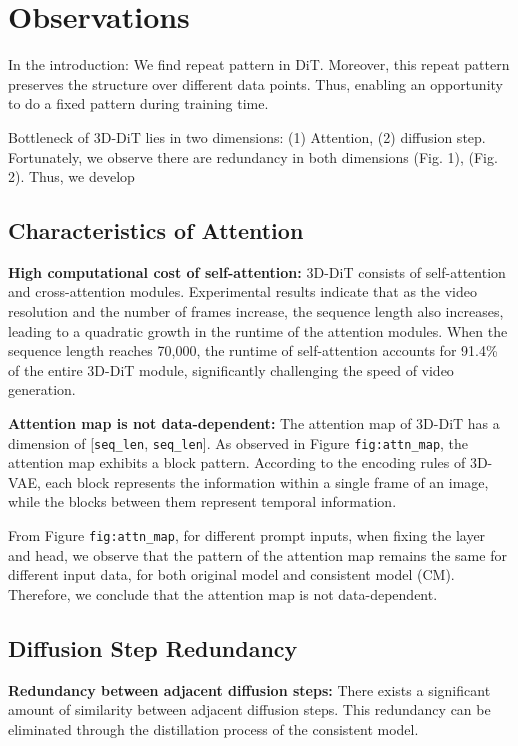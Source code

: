 
\section{Observations}

In the introduction:
We find repeat pattern in DiT. Moreover, this repeat pattern preserves the structure over different data points. Thus, enabling an opportunity to do a fixed pattern during training time.


Bottleneck of 3D-DiT lies in two dimensions: (1) Attention, (2) diffusion step. Fortunately, we observe there are redundancy in both dimensions (Fig. 1), (Fig. 2). Thus, we develop
\subsection{Characteristics of Attention}

\textbf{High computational cost of self-attention:} 3D-DiT consists of self-attention and cross-attention modules. Experimental results indicate that as the video resolution and the number of frames increase, the sequence length also increases, leading to a quadratic growth in the runtime of the attention modules. When the sequence length reaches 70,000, the runtime of self-attention accounts for 91.4\% of the entire 3D-DiT module, significantly challenging the speed of video generation.

\textbf{Attention map is not data-dependent:} The attention map of 3D-DiT has a dimension of [\texttt{seq\_len}, \texttt{seq\_len}]. As observed in Figure \texttt{fig:attn\_map}, the attention map exhibits a block pattern. According to the encoding rules of 3D-VAE, each block represents the information within a single frame of an image, while the blocks between them represent temporal information.

From Figure \texttt{fig:attn\_map}, for different prompt inputs, when fixing the layer and head, we observe that the pattern of the attention map remains the same for different input data, for both original model and consistent model (CM). Therefore, we conclude that the attention map is not data-dependent.

\subsection{Diffusion Step Redundancy}

\textbf{Redundancy between adjacent diffusion steps:} There exists a significant amount of similarity between adjacent diffusion steps. This redundancy can be eliminated through the distillation process of the consistent model.

